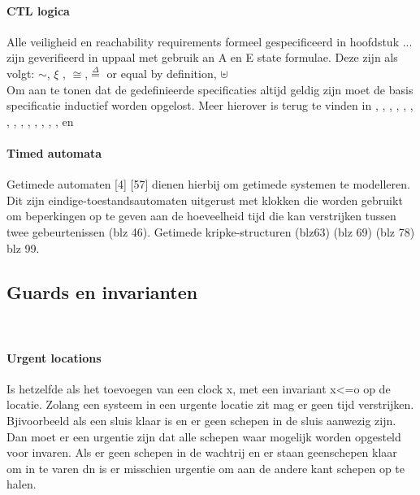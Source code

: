 \documentclass{article}
\begin{document}
	
	
	\paragraph{CTL logica}
	Alle veiligheid en reachability requirements formeel gespecificeerd in hoofdstuk ... zijn geverifieerd in uppaal met gebruik an A en E state formulae. Deze zijn als volgt:
	$\sim$, $\xi$ , $\cong$,$\overset{\Delta}{=}$ or equal by definition, $\uplus$
	\newline \\
	Om aan te tonen dat de gedefinieerde specificaties altijd geldig zijn moet de basis specificatie inductief worden opgelost. Meer hierover  is terug te vinden in \cite{latin06}  \cite[p.~73]{realtimeForms}  ,\cite[p.~82]{realtimeForms}  ,\cite[p.~83]{realtimeForms}  ,\cite[p.~90]{realtimeForms}  ,\cite[p.~91]{realtimeForms}  ,\cite[p.~92]{realtimeForms}  ,\cite[p.~93]{realtimeForms}  ,\cite[p.~98]{realtimeForms}  ,\cite[p.~104]{realtimeForms}  ,\cite[p.~156]{realtimeForms}  ,\cite[p.~197]{realtimeForms}  , \cite[p.~225]{realtimeForms}  , \cite[p.~236]{realtimeForms}  , \cite[p.~315]{realtimeForms}  , \cite[p.~317]{realtimeForms}  en  \cite[p.~318]{realtimeForms}  
	
	
	\paragraph{Timed automata}
	Getimede automaten [4] [57] dienen hierbij om getimede systemen te modelleren. Dit zijn eindige-toestandsautomaten uitgerust met klokken die worden gebruikt om beperkingen op te geven aan de hoeveelheid tijd die kan verstrijken tussen twee gebeurtenissen (blz 46). Getimede kripke-structuren (blz63) (blz 69) (blz 78) blz 99.
	\cite{nourollahi20191215}
	
	\subsection{Guards en invarianten} \\
	\paragraph{Urgent locations}
	
	Is hetzelfde als het toevoegen van een clock x, met een invariant x<=o op de locatie. Zolang een systeem in een urgente locatie zit mag er geen tijd verstrijken.
	Bjivoorbeeld als een sluis klaar is en er geen schepen in de sluis aanwezig zijn. Dan moet er een urgentie zijn dat alle schepen waar mogelijk worden opgesteld voor invaren. Als er geen schepen in de wachtrij en er staan geenschepen klaar om in te varen dn is er misschien urgentie om aan de andere kant schepen op te halen. \\
\end{document}
